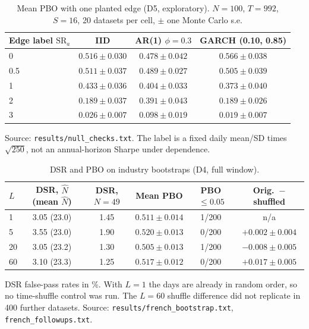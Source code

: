 \documentclass[11pt,a4paper]{article}
\newcommand{\SR}{\mathrm{SR}}
\begin{document}
\begin{table}[htbp]
\centering\small
\caption{Mean PBO with one planted edge (D5, exploratory). $N=100$, $T=992$, $S=16$, 20 datasets per cell, $\pm$ one Monte Carlo s.e.}\label{tab:d5}
\begin{tabular}{@{}lccc@{}}
\toprule
Edge label $\SR_a$ & IID & AR(1) $\phi=0.3$ & GARCH (0.10, 0.85) \\
\midrule
0 & $0.516\pm0.030$ & $0.478\pm0.042$ & $0.566\pm0.038$ \\
0.5 & $0.511\pm0.037$ & $0.489\pm0.027$ & $0.505\pm0.039$ \\
1 & $0.433\pm0.036$ & $0.404\pm0.033$ & $0.373\pm0.040$ \\
2 & $0.189\pm0.037$ & $0.391\pm0.043$ & $0.189\pm0.026$ \\
3 & $0.026\pm0.007$ & $0.098\pm0.019$ & $0.019\pm0.007$ \\
\bottomrule
\end{tabular}
\par\smallskip\raggedright\footnotesize Source: \texttt{results/null\_checks.txt}. The label is a fixed daily mean/SD times $\sqrt{250}$, not an annual-horizon Sharpe under dependence.
\end{table}

\begin{table}[htbp]
\centering\small
\caption{DSR and PBO on industry bootstraps (D4, full window).}\label{tab:d4extra}
\begin{tabular}{@{}lccccc@{}}
\toprule
$L$ & DSR, $\hat N$ (mean $\hat N$) & DSR, $N=49$ & Mean PBO & PBO$\,\le0.05$ & Orig.\ $-$ shuffled \\
\midrule
1 & 3.05 (23.0) & 1.45 & $0.511\pm0.014$ & 1/200 & n/a \\
5 & 3.55 (23.0) & 1.90 & $0.520\pm0.013$ & 0/200 & $+0.002\pm0.004$ \\
20 & 3.05 (23.2) & 1.30 & $0.505\pm0.013$ & 1/200 & $-0.008\pm0.005$ \\
60 & 3.10 (23.3) & 1.25 & $0.517\pm0.012$ & 0/200 & $+0.017\pm0.005$ \\
\bottomrule
\end{tabular}
\par\smallskip\raggedright\footnotesize DSR false-pass rates in \%. With $L=1$ the days are already in random order, so no time-shuffle control was run. The $L=60$ shuffle difference did not replicate in 400 further datasets. Source: \texttt{results/french\_bootstrap.txt}, \texttt{french\_followups.txt}.
\end{table}
\end{document}
